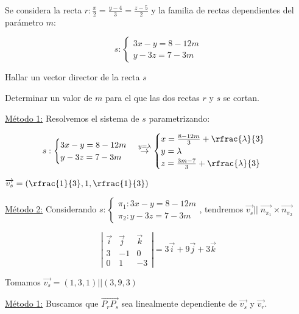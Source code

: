 \documentclass[palatino,nosec,nochap,nobuilddate]{Docencia}
\renewcommand{\vec}[1]{\overrightarrow{#1}}
\begin{document}
\begin{problem}

Se considera la recta $r: \frac{x}{2} = \frac{y-4}{3} = \frac{z-5}{2}$ y la familia de rectas dependientes del parámetro $m$:

\[
	s: \begin{cases} 3x-y=8-12m\\y-3z = 7-3m \end{cases}
\]

\ppart Hallar un vector director de la recta $s$

\ppart Determinar un valor de $m$ para el que las dos rectas $r$ y $s$ se cortan.

\solution

\spart \ul{Método 1:} Resolvemos el sistema de $s$ parametrizando:

\[
	s: \begin{cases} 3x-y=8-12m\\y-3z = 7-3m \end{cases} \overset{y=\lambda}{\to} \begin{cases}
	x = \frac{8-12m}{3} + \rfrac{\lambda}{3}\\
	y = \lambda \\
	z = \frac{3m-7}{3} + \rfrac{\lambda}{3}
	\end{cases}
\]

$\vec{v_s} = \left(\rfrac{1}{3},1,\rfrac{1}{3}\right)$

\ul{Método 2:} Considerando $s:\begin{cases}
\pi_1:3x-y=8-12m
 \\
\pi_2:y-3z = 7-3m
\end{cases}$, tendremos $\vec{v_s} ||\; \vec{n_{\pi_1}}\times \vec{n_{\pi_2}}$

\[
\left|\begin{matrix}
\vec{i} & \vec{j} & \vec{k}\\
3&-1&0\\
0&1&-3
\end{matrix}\right| = 3\vec{i} + 9\vec{j} + 3\vec{k}
\]

Tomamos $\vec{v_s} = (1,3,1) || (3,9,3)$

\spart \ul{Método 1:} Buscamos que $\vec{P_rP_s}$ sea linealmente dependiente de $\vec{v_s}$ y $\vec{v_r}$.


\end{problem}
\end{document}
